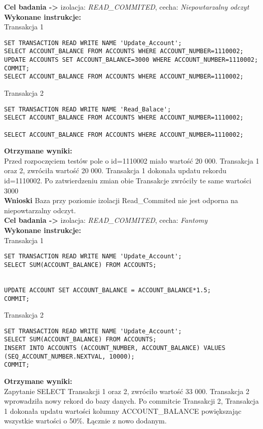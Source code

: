 \documentclass[11pt,oneside, a4paper]{article}
\begin{document}
\textbf{Cel badania ->} izolacja:
\textit{READ\_COMMITED}, cecha:
\textit{Niepowtarzalny odczyt} \\
\textbf{Wykonane instrukcje: } \\
Transakcja 1
\begin{lstlisting}
SET TRANSACTION READ WRITE NAME 'Update_Account';
SELECT ACCOUNT_BALANCE FROM ACCOUNTS WHERE ACCOUNT_NUMBER=1110002;
UPDATE ACCOUNTS SET ACCOUNT_BALANCE=3000 WHERE ACCOUNT_NUMBER=1110002;
COMMIT;
SELECT ACCOUNT_BALANCE FROM ACCOUNTS WHERE ACCOUNT_NUMBER=1110002;
\end{lstlisting}
Transakcja 2
\begin{lstlisting}
SET TRANSACTION READ WRITE NAME 'Read_Balace';
SELECT ACCOUNT_BALANCE FROM ACCOUNTS WHERE ACCOUNT_NUMBER=1110002;

SELECT ACCOUNT_BALANCE FROM ACCOUNTS WHERE ACCOUNT_NUMBER=1110002;
\end{lstlisting}
\textbf{Otrzymane wyniki:} \\
    Przed rozpoczęciem testów pole o id=1110002 miało wartość 20 000. Transakcja 1 oraz 2, zwróciła  wartość 20 000. Transakcja 1 dokonała updatu rekordu id=1110002. Po zatwierdzeniu zmian obie Transakcje zwróciły te same wartości 3000\\
\textbf{Wnioski } Baza przy poziomie izolacji Read\_Commited nie jest odporna na niepowtarzalny odczyt.\\
\newpage
\textbf{Cel badania ->} izolacja:
\textit{READ\_COMMITED}, cecha:
\textit{Fantomy} \\
\textbf{Wykonane instrukcje: } \\
Transakcja 1
\begin{lstlisting}
SET TRANSACTION READ WRITE NAME 'Update_Account';
SELECT SUM(ACCOUNT_BALANCE) FROM ACCOUNTS;


UPDATE ACCOUNT SET ACCOUNT_BALANCE = ACCOUNT_BALANCE*1.5;
COMMIT;
\end{lstlisting}
Transakcja 2
\begin{lstlisting}
SET TRANSACTION READ WRITE NAME 'Update_Account';
SELECT SUM(ACCOUNT_BALANCE) FROM ACCOUNTS;
INSERT INTO ACCOUNTS (ACCOUNT_NUMBER, ACCOUNT_BALANCE) VALUES (SEQ_ACCOUNT_NUMBER.NEXTVAL, 10000);
COMMIT;
\end{lstlisting}
\textbf{Otrzymane wyniki:} \\
    Zapytanie SELECT Transakcji 1 oraz 2, zwróciło  wartość 33 000. Transakcja 2 wprowadziła nowy rekord do bazy danych. Po commitcie Transakcji 2, Transakcja 1 dokonała updatu wartości kolumny ACCOUNT\_BALANCE powiększając wszystkie wartości o 50\%. Łącznie z nowo dodanym.
\end{document}
